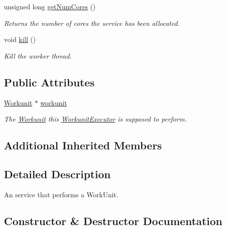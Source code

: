 \begin{DoxyCompactItemize}
unsigned long \hyperlink{classwrench_1_1_workunit_executor_ad2062b2e147a0a511fbdd553688efde8}{get\+Num\+Cores} ()
\begin{DoxyCompactList}\small\item\em Returns the number of cores the service has been allocated. \end{DoxyCompactList}\item 
\mbox{\label{classwrench_1_1_workunit_executor_a11aa48852a4b8d61b85b8c90be8827e8}} 
void \hyperlink{classwrench_1_1_workunit_executor_a11aa48852a4b8d61b85b8c90be8827e8}{kill} ()
\begin{DoxyCompactList}\small\item\em Kill the worker thread. \end{DoxyCompactList}\end{DoxyCompactItemize}
\subsection*{Public Attributes}
\begin{DoxyCompactItemize}
\item 
\mbox{\label{classwrench_1_1_workunit_executor_aeadc474fc7ec48fbb1f25d96389217e3}} 
\hyperlink{classwrench_1_1_workunit}{Workunit} $\ast$ \hyperlink{classwrench_1_1_workunit_executor_aeadc474fc7ec48fbb1f25d96389217e3}{workunit}
\begin{DoxyCompactList}\small\item\em The \hyperlink{classwrench_1_1_workunit}{Workunit} this \hyperlink{classwrench_1_1_workunit_executor}{Workunit\+Executor} is supposed to perform. \end{DoxyCompactList}\end{DoxyCompactItemize}
\subsection*{Additional Inherited Members}


\subsection{Detailed Description}
An service that performs a Work\+Unit. 

\subsection{Constructor \& Destructor Documentation}
\mbox{\label{classwrench_1_1_workunit_executor_ac89772afa4d480de6b7033a2d435e160}} 
